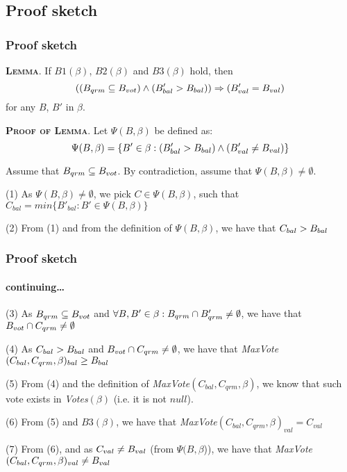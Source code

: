 \documentclass[10 pt]{beamer}
\begin{document}
\subsection{Proof sketch}


\begin{frame}
\frametitle{Proof sketch}

\textsc{\textbf{Lemma}}. If $B1(\beta)$, $B2(\beta)$ and $B3(\beta)$ hold, then $$((B_{qrm} \subseteq B_{vot}) \wedge (B'_{bal} > B_{bal})) \Rightarrow (B'_{val} = B_{val})$$ for any $B$, $B'$ in $\beta$.

\pause
\vspace{3 mm}
\textsc{\textbf{Proof of Lemma}}. Let $\Psi(B, \beta)$ be defined as: $$\Psi(B, \beta) = \{B' \in \beta : (B'_{bal} > B_{bal}) \wedge (B'_{val} \neq B_{val})\}$$


Assume that $B_{qrm} \subseteq B_{vot}$. By contradiction, assume that $\Psi(B, \beta) \neq \emptyset$.

\pause
\vspace{3 mm}
(1) As $\Psi(B, \beta) \neq \emptyset$, we pick $C \in \Psi(B, \beta)$, such that $C_{bal} = min\{B'_{bal} : B' \in \Psi(B, \beta)\}$

\pause
\vspace{2 mm}
(2) From (1) and from the definition of $\Psi(B, \beta)$, we have that $C_{bal} > B_{bal}$

\end{frame}

\begin{frame}
\frametitle{Proof sketch}
\framesubtitle{continuing\ldots}

(3) As $B_{qrm} \subseteq B_{vot}$ and $\forall B, B' \in \beta : B_{qrm} \cap B'_{qrm} \neq \emptyset$, we have that $B_{vot} \cap C_{qrm} \neq \emptyset$

\pause
\vspace{2 mm}
(4) As $C_{bal} > B_{bal}$ and $B_{vot} \cap C_{qrm} \neq \emptyset$, we have that \textit{MaxVote}$(C_{bal}, C_{qrm}, \beta)_{bal} \geq B_{bal}$

\pause
\vspace{2 mm}
(5) From (4) and the definition of \textit{MaxVote}$(C_{bal}, C_{qrm}, \beta)$, we know that such vote exists in \textit{Votes}$(\beta)$ (i.e. it is not $null$).

\pause
\vspace{2 mm}
(6) From (5) and $B3(\beta)$, we have that \textit{MaxVote}$(C_{bal}, C_{qrm}, \beta)_{val} = C_{val}$

\pause
\vspace{2 mm}
(7) From (6), and as $C_{val} \neq B_{val}$ (from $\Psi(B, \beta$)), we have that \textit{MaxVote}$(C_{bal}, C_{qrm}, \beta)_{val} \neq B_{val}$

\end{frame}
\end{document}
